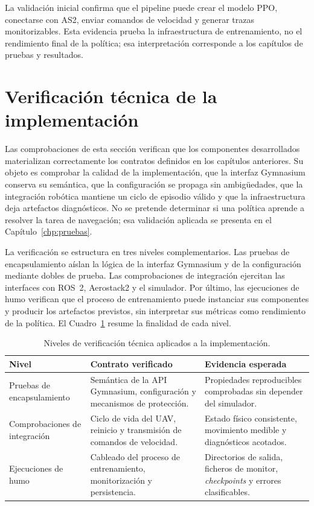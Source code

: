 La validación inicial confirma que el pipeline puede crear el modelo PPO,
conectarse con AS2, enviar comandos de velocidad y generar trazas
monitorizables. Esta evidencia prueba la infraestructura de entrenamiento, no el
rendimiento final de la política; esa interpretación corresponde a los capítulos
de pruebas y resultados.

\section{Verificación técnica de la implementación}
\label{sct:pruebas:estrategia}

Las comprobaciones de esta sección verifican que los componentes desarrollados
materializan correctamente los contratos definidos en los capítulos anteriores.
Su objeto es comprobar la calidad de la implementación, que la interfaz Gymnasium conserva
su semántica, que la configuración se propaga sin ambigüedades, que la integración
robótica mantiene un ciclo de episodio válido y que la infraestructura deja
artefactos diagnósticos. No se pretende determinar si una política aprende a
resolver la tarea de navegación; esa validación aplicada se presenta en el
Capítulo~\ref{chp:pruebas}.

La verificación se estructura en tres niveles complementarios. Las pruebas de
encapsulamiento aíslan la lógica de la interfaz Gymnasium y de la configuración mediante dobles
de prueba. Las comprobaciones de integración ejercitan las interfaces con ROS~2,
Aerostack2 y el simulador. Por último, las ejecuciones de humo verifican que el
proceso de entrenamiento puede instanciar sus componentes y producir los
artefactos previstos, sin interpretar sus métricas como rendimiento de la
política. El Cuadro~\ref{tab:pruebas:niveles_validacion} resume la finalidad de
cada nivel.

\begin{table}[H]
\centering
\small
\setlength{\tabcolsep}{4pt}
\renewcommand{\arraystretch}{1.15}
\begin{tabular}{p{} p{} p{}}
\hline
\textbf{Nivel} & \textbf{Contrato verificado} & \textbf{Evidencia esperada} \\
\hline
Pruebas de encapsulamiento & Semántica de la API Gymnasium, configuración y mecanismos de protección. & Propiedades reproducibles comprobadas sin depender del simulador. \\
Comprobaciones de integración & Ciclo de vida del UAV, reinicio y transmisión de comandos de velocidad. & Estado físico consistente, movimiento medible y diagnósticos acotados. \\
Ejecuciones de humo & Cableado del proceso de entrenamiento, monitorización y persistencia. & Directorios de salida, ficheros de monitor, \emph{checkpoints} y errores clasificables. \\
\hline
\end{tabular}
\caption{Niveles de verificación técnica aplicados a la implementación.}
\label{tab:pruebas:niveles_validacion}
\end{table}


